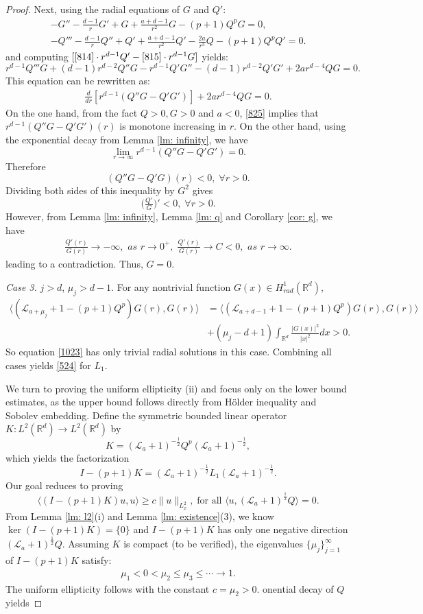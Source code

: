 \documentclass[12pt]{amsart}
\newcommand{\R}{\mathbb R}
\newcommand{\la}{\mathcal L_a}
\begin{document}
\begin{proof}
Next, using the radial equations of $G$ and $Q'$:
\begin{gather}
-G''-\tfrac {d-1}r G'+G+\tfrac{a+d-1}{r^2}G-(p+1)Q^p G=0,\label{814}\\
-Q'''-\tfrac {d-1}r Q''+Q'+\tfrac{a+d-1}{r^2}Q'-\tfrac{2a}{r^3}Q-(p+1)Q^pQ'=0.\label{815}
\end{gather}
and computing $[\eqref{814}\cdot r^{d-1}Q'-\eqref{815}\cdot r^{d-1}G]$ yields: 
\[r^{d-1}Q'''G+(d-1)r^{d-2}Q''G-r^{d-1}Q'G''-(d-1)r^{d-2}Q'G'+{2a}r^{d-4}QG=0.\]
This equation can be rewritten as:
\begin{align}\label{825}
\tfrac d{dr}[r^{d-1}(Q''G-Q'G')]+{2a}r^{d-4} QG=0. 
\end{align}
On the one hand, from the fact $Q>0, G>0$ and $a<0$, \eqref{825} implies that $r^{d-1}(Q''G-Q'G')(r)$ is monotone increasing in $r$. On the other hand, using the exponential decay from Lemma \ref{lm: infinity}, we have
\[\lim_{r\to \infty} r^{d-1}(Q''G-Q'G')=0.\]
Therefore 
\[(Q''G-Q'G)(r)<0, \; \forall r>0.\]
Dividing both sides of this inequality by $G^2$ gives
\[\bigl (\tfrac{Q'}G\bigr)'<0,\; \forall r>0.\]
However, from Lemma \ref{lm: infinity}, Lemma \ref{lm: q} and Corollary \ref{cor: g}, we have
\begin{align*}
\tfrac {Q'(r)}{G(r)}\to -\infty,\textit{ as } r\to 0^+,\;
\tfrac{Q'(r)}{G(r)}\to C<0,\textit{ as } r\to \infty. 
\end{align*}
leading to a contradiction. Thus, $G=0$. 

{\it Case 3.} $j>d$, $\mu_j>d-1$. 
For any nontrivial function $G(x)\in H_{rad}^1(\R^d)$,
\begin{align*}
\langle (\mathcal L_{a+\mu_j}+1-(p+1)Q^p)G(r), G(r)\rangle&=\langle(\mathcal L_{a+d-1}+1-(p+1)Q^p)G(r),G(r)\rangle\\
&+(\mu_j-d+1)\int_{\R^d}\frac{|G(x)|^2}{|x|^2} dx>0. 
\end{align*}
So equation \eqref{1023} has only trivial radial solutions in this case. Combining all cases yields \eqref{524} for $L_1$. 




We turn to proving the uniform ellipticity (ii) and focus only on the lower bound estimates, as the upper bound follows
directly from H\"older inequality and Sobolev embedding.
Define the symmetric bounded linear operator $K: L^2(\R^d) \to L^2(\R^d)$ by
\[K=(\la+1)^{-\frac 12}Q^p(\la+1)^{-\frac 12},\]
which yields the factorization 
\[I-(p+1)K=(\la+1)^{-\frac 12}L_1(\la+1)^{-\frac 12}.\]
Our goal reduces to proving  
\[\langle (I-(p+1)K)u, u\rangle \ge c\|u\|_{L_x^2}, \; \text{for all } \langle u, (\la+1)^{\frac 12}Q\rangle =0.\]
From 
Lemma \ref{lm: l2}(i)  
 and Lemma \ref{lm: existence}(3), we know $\ker (I-(p+1)K)=\{0\} $ and $I-(p+1)K$ has only one negative direction $(\la+1)^{\frac 12}Q$. 
Assuming $K$ is compact (to be verified), the eigenvalues $\{\mu_j\}_{j=1}^\infty$ of $I-(p+1)K$ satisfy:
\begin{align*}
\mu_1<0<\mu_2\le \mu_3\le\cdots\to 1.
\end{align*}
The uniform ellipticity follows with the constant $c=\mu_2>0$. 
onential decay of $Q$ yields 





\end{proof}
\end{document}
